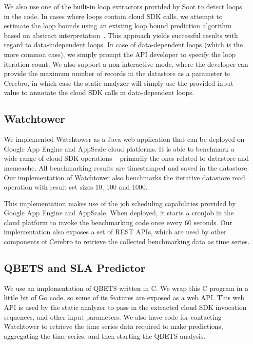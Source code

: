 We also use one of the built-in loop extractors provided by
Soot to detect loops in the code. In cases where loops contain cloud SDK calls, we attempt to estimate
the loop bounds using an existing loop bound prediction algorithm based on abstract interpretation~\cite{bygde2010static}. This
approach yields successful results with regard to data-independent loops. In case of data-dependent
loops (which is the more common case), we simply prompt the API developer to specify the loop iteration
count. We also support a non-interactive mode, where the developer can provide the maximum number of
records in the datastore as a parameter to Cerebro, in which case the static analyzer will simply use the
provided input value to annotate the cloud SDK calls in data-dependent loops.

\subsection{Watchtower}
We implemented Watchtower as a Java web application that can be deployed on Google App Engine and
AppScale cloud platforms. It is able to benchmark a wide range of cloud SDK operations
-- primarily the ones related to datastore and memcache. All benchmarking results are timestamped and 
saved in the datastore. Our implementation of Watchtower also benchmarks the iterative datastore read operation
with result set sizes 10, 100 and 1000. 

This implementation makes use of the job scheduling capabilities provided by Google App
Engine and AppScale. When deployed, it starts a cronjob in the cloud platform to invoke the benchmarking code
once every 60 seconds. Our implementation also exposes a set of REST APIs, which
are used by other components of Cerebro to retrieve the collected benchmarking data as time series.

\subsection{QBETS and SLA Predictor}
We use an implementation of QBETS written in C. We wrap this C program in a little bit of Go code, so some 
of its features are exposed as a web API. This web API is used by the static analyzer to pass in the extracted
cloud SDK invocation sequences, and other input parameters. We also have code for contacting Watchtower 
to retrieve the time series data required to make predictions, aggregating the time series, and then 
starting the QBETS analysis. 

